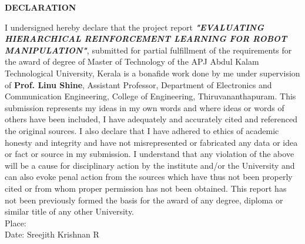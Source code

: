 \newpage
\thispagestyle{empty}
\begin{center}  {\Large \bf{DECLARATION}}\vspace{0.6cm}\end{center}
I undersigned hereby declare that the project report \emph{\textbf{"EVALUATING HIERARCHICAL REINFORCEMENT LEARNING FOR ROBOT MANIPULATION"}}, submitted for partial fulfillment of the requirements for the award of degree of Master of Technology of the APJ Abdul Kalam Technological University, Kerala is a bonafide work done by me under supervision of \textbf{Prof. Linu Shine}, Assistant Professor, Department of Electronics and Communication Engineering, College of Engineering, Thiruvananthapuram. This submission represents my ideas in my own words and where ideas or words of others have been included, I have adequately and accurately cited and referenced the original sources. I also declare that I have adhered to ethics of academic honesty and integrity and have not misrepresented or fabricated any data or idea or fact or source in my submission. I understand that any violation of the above will be a cause for disciplinary action by the institute and/or the University and can also evoke penal action from the sources which have thus not been properly cited or from whom proper permission has not been obtained. This report has not been previously formed the basis for the award of any degree, diploma or similar title of any other University.\\
\newline
Place:
\hfill
 \\
Date:
\hfill
Sreejith Krishnan R